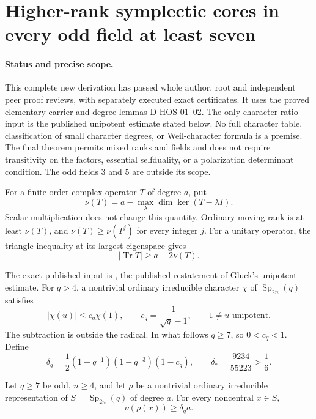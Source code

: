 \section{Higher-rank symplectic cores in every odd field at least seven}
\label{sec:higher-odd-symplectic}

\paragraph{Status and precise scope.}
This complete new derivation has passed whole author, root and
independent peer proof reviews, with separately executed exact certificates. It uses the proved elementary carrier and degree
lemmas D-HOS-01--02. The only character-ratio input is the published
unipotent estimate stated below. No full character table, classification
of small character degrees, or Weil-character formula is a premise.
The final theorem permits mixed ranks and fields and does not require
transitivity on the factors, essential selfduality, or a polarization
determinant condition. The odd fields $3$ and $5$ are outside its scope.

For a finite-order complex operator $T$ of degree $a$, put
\[
 \nu(T)=a-\max_\lambda\dim\ker(T-\lambda I).
\]
Scalar multiplication does not change this quantity. Ordinary moving
rank is at least $\nu(T)$, and $\nu(T)\ge\nu(T^j)$ for every integer
$j$. For a unitary operator, the triangle inequality at its largest
eigenspace gives
\[
                 |\operatorname{Tr}T|\ge a-2\nu(T).       \tag{HOS.13}
\]

The exact published input is
\cite[simply connected conventions, p.~2;
Theorem~2.4(i), pp.~3--4]{HES:Liebeck2017}, the published restatement
of Gluck's unipotent estimate. For $q>4$, a nontrivial ordinary
irreducible character $\chi$ of $\operatorname{Sp}_{2n}(q)$ satisfies
\[
 |\chi(u)|\le c_q\chi(1),\qquad
 c_q=\frac1{\sqrt q-1},\qquad
                 1\ne u\text{ unipotent}.                 \tag{HOS.14}
\]
The subtraction is outside the radical. In what follows $q\ge7$,
so $0<c_q<1$. Define
\[
 \delta_q=\frac12(1-q^{-1})(1-q^{-3})(1-c_q),\qquad
 \delta_* =\frac{9234}{55223}>\frac16.                     \tag{HOS.15}
\]

\begin{lemma}
\label{D-HOS-03}
Let $q\ge7$ be odd, $n\ge4$, and let $\rho$ be a nontrivial
ordinary irreducible representation of $S=\operatorname{Sp}_{2n}(q)$
of degree $a$. For every noncentral $x\in S$,
\[
                         \nu(\rho(x))\ge\delta_q a.        \tag{HOS.16}
\]
\end{lemma}

